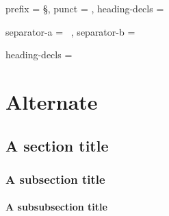 \documentclass[twocolumn]{report}
\begin{document}
 { prefix = \S,
   punct =  ,
   heading-decls = \sffamily \bfseries
 }

 { separator-a = \, ,
   separator-b = \
 }

 {  heading-decls = \sffamily \bfseries \itshape
 }

\chapter{Alternate}          \kant[1]
\section{A section title}             \kant[2]
\subsection{A subsection title}       \kant[3]
\subsubsection{A subsubsection title} \kant[4]


%
%
\end{document}

